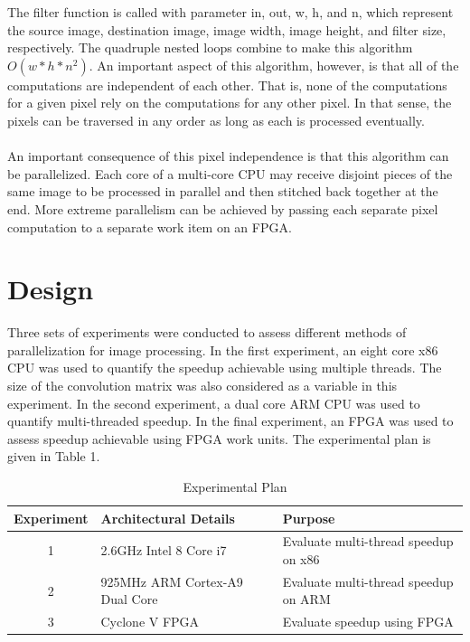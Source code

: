 \documentclass{article} %
\begin{document}
The filter function is called with parameter in, out, w, h, and n, which represent the source image, destination image, image width, image height, and filter size, respectively. The quadruple nested loops combine to make this algorithm $O(w*h*n^2)$. An important aspect of this algorithm, however, is that all of the computations are independent of each other. That is, none of the computations for a given pixel rely on the computations for any other pixel.  In that sense, the pixels can be traversed in any order as long as each is processed eventually. \\
\\
An important consequence of this pixel independence is that this algorithm can be parallelized. Each core of a multi-core CPU may receive disjoint pieces of the same image to be processed in parallel and then stitched back together at the end.  More extreme parallelism can be achieved by passing each separate pixel computation to a separate work item on an FPGA. 

\section{Design}
Three sets of experiments were conducted to assess different methods of parallelization for image processing.  In the first experiment, an eight core x86 CPU was used to quantify the speedup achievable using multiple threads. The size of the convolution matrix was also considered as a variable in this experiment.  In the second experiment, a dual core ARM CPU was used to quantify multi-threaded speedup.  In the final experiment, an FPGA was used to assess speedup achievable using FPGA work units. The experimental plan is given in Table 1. 

\begin{table}[h!]
\centering
\begin{tabular}{|c|l|l|}
\hline
\textbf{Experiment} & \textbf{Architectural Details} & \textbf{Purpose} \\
\hline\hline
1 & 2.6GHz Intel 8 Core i7  & Evaluate multi-thread speedup on x86 \\
2 & 925MHz ARM Cortex-A9 Dual Core & Evaluate multi-thread speedup on ARM  \\
3 & Cyclone V FPGA & Evaluate speedup using FPGA \\
\hline
\end{tabular}
\caption{Experimental Plan}
\end{table}

\end{document}
